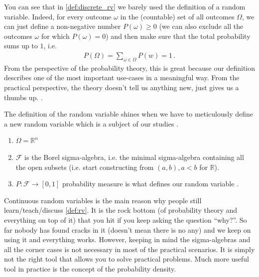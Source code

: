 You can see that in \cref{def:discrete_rv} we barely used the definition of a random variable. 
Indeed, for every outcome $\omega$ in the (countable) set of all outcomes $\Omega$, we can just define a non-negative number $P(\omega) \geq 0$ (we can also exclude all the outcomes $\omega$ for which $P(\omega) = 0$) and then make sure that the total probability sums up to $1$, i.e.
\begin{align}
    P(\Omega) = \sum_{\omega \in \Omega} P(w) = 1\,.
\end{align}
From the perspective of the probability theory, this is great because our definition describes one of the most important use-cases in a meaningful way.
From the practical perspective, the theory doesn't tell us anything new, just gives us a thumbs up. .

\begin{mybox}
\begin{definition}\label{def:continuous_rv}
    The definition of the random variable shines when we have to meticulously define a new random variable which is a subject of our studies .
    \begin{enumerate}
        \item $\Omega = \mathbb{R}^n$ 
        \item $\mathcal{F}$ is the Borel sigma-algebra, i.e. the minimal sigma-algebra containing all the open subsets (i.e. start constructing from $(a,b), a < b$ for $\mathbb{R}$).
        \item $P: \mathcal{F} \to [0,1]$ probability measure is what defines our random variable .
    \end{enumerate}
\end{definition}
\end{mybox}

Continuous random variables is the main reason why people still learn/teach/discuss \cref{def:rv}.
It is the rock bottom (of probability theory and everything on top of it) that you hit if you keep asking the question ``why?''.
So far nobody has found cracks in it (doesn't mean there is no any) and we keep on using it and everything works.
However, keeping in mind the sigma-algebras and all the corner cases is not necessary in most of the practical scenarios.
It is simply not the right tool that allows you to solve practical problems.
Much more useful tool in practice is the concept of the probability density.

